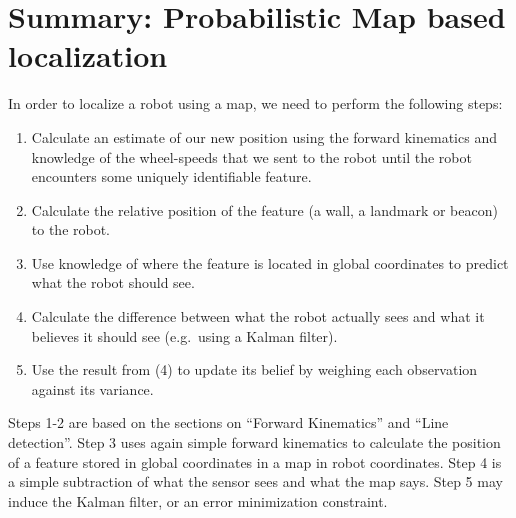 \section{Summary: Probabilistic Map based localization}\label{sec:pmbl}
In order to localize a robot using a map, we need to perform the following steps:
\begin{enumerate}
\item Calculate an estimate of our new position using the forward kinematics and knowledge of the wheel-speeds that we sent to the robot until the robot encounters some uniquely identifiable feature.
\item Calculate the relative position of the feature (a wall, a landmark or beacon) to the robot.
\item Use knowledge of where the feature is located in global coordinates to predict what the robot should see.
\item Calculate the difference between what the robot actually sees and what it believes it should see (e.g.\ using a Kalman filter).
\item Use the result from (4) to update its belief by weighing each observation against its variance.
\end{enumerate}

Steps 1-2 are based on the sections on ``Forward Kinematics'' and ``Line detection''. Step 3 uses again simple forward kinematics to calculate the position of a feature stored in global coordinates in a map in robot coordinates. Step 4 is a simple subtraction of what the sensor sees and what the map says. Step 5 may induce the Kalman filter, or an error minimization constraint. %


